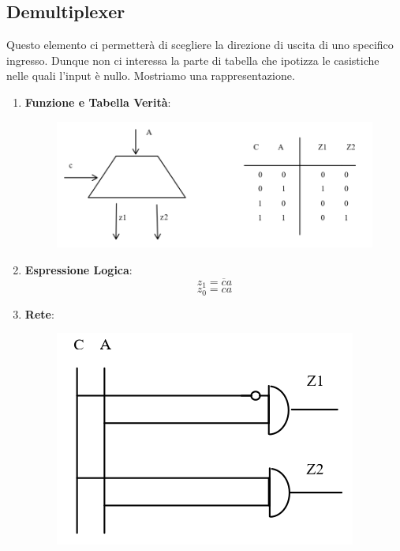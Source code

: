 \documentclass{article}
\begin{document}
\newpage

\subsection{Demultiplexer}

Questo elemento ci permetterà di scegliere la direzione di uscita di uno specifico ingresso. Dunque non ci interessa la parte di tabella che ipotizza le casistiche nelle quali l'input è nullo. Mostriamo una rappresentazione.

\vspace*{25px}

\begin{enumerate}
    \item \textbf{Funzione e Tabella Verità}:
    \begin{figure}[htbp]
    \center
    \includegraphics[scale=0.5]{img/demultiplexer1.png}
    \end{figure}
    \vspace*{25px}
    \item \textbf{Espressione Logica}:
    \vspace*{5px}
    \[ z_{1} = \overline{c}a \]
    \[ z_{0} = ca \]
    \vspace*{25px}
    \item \textbf{Rete}:
    \vspace*{5px}
    \begin{figure}[htbp]
    \center
    \includegraphics[scale=0.5]{img/demultiplexer2.png}
\end{figure}
\end{enumerate}
\end{document}
